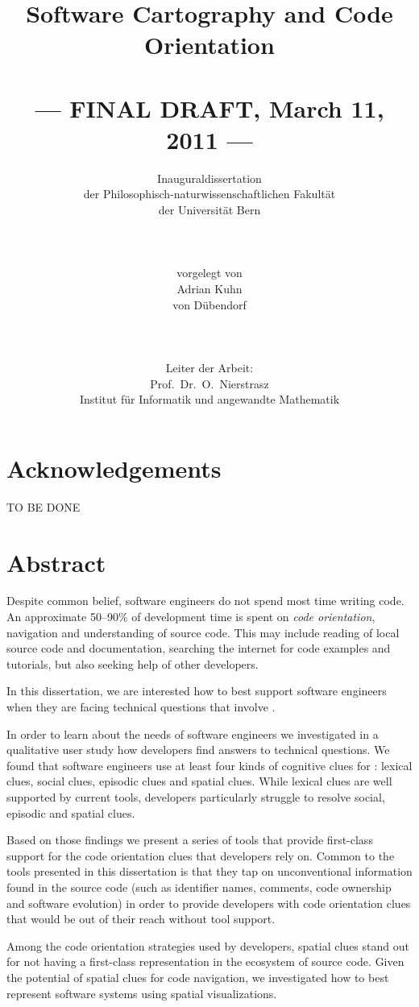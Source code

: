 \documentclass[10pt]{book}
\title{Software Cartography and Code Orientation\\~\\--- FINAL DRAFT, March 11, 2011 ---}
\author{Inauguraldissertation\\
der Philosophisch-naturwissenschaftlichen Fakult\"at\\
der Universit\"at Bern\\
\\
\\
\\
vorgelegt von\\
Adrian Kuhn\\
von D\"ubendorf\\ 
\\
\\
\\
Leiter der Arbeit:\\
Prof.\ Dr.\ O.\ Nierstrasz\\ 
Institut f\"ur Informatik und angewandte Mathematik}
\date{}
\begin{document}
\maketitle

\chapter*{Acknowledgements}
TO BE DONE

\chapter*{Abstract}

Despite common belief, software engineers do not spend most time writing code. An approximate 50--90\% of development time is spent on \emph{code orientation}, \ie navigation and understanding of source code. This may include reading of local source code and documentation, searching the internet for code examples and tutorials, but also seeking help of other developers. 

In this dissertation, we are interested how to best support software engineers when they are facing technical questions that involve \codenavigation. 

In order to learn about the \codenavigation needs of software engineers we investigated in a qualitative user study how developers find answers to technical questions. We found that software engineers use at least four kinds of cognitive clues for \codenavigation: 
	lexical clues, 
	social clues, 
	episodic clues 
	and spatial clues.
While lexical clues are well supported by current tools, developers particularly struggle to resolve social, episodic and spatial clues. 

Based on those findings we present a series of tools that provide first-class support for the code orientation clues that developers rely on. Common to the tools presented in this dissertation is that they tap on unconventional information found in the source code (such as identifier names, comments, code ownership and software evolution) in order to provide developers with code orientation clues that would be out of their reach without tool support.

Among the code orientation strategies used by developers, spatial clues stand out for not having a first-class representation in the ecosystem of source code. Given the potential of spatial clues for code navigation, we investigated how to best represent software systems using spatial visualizations. 
\end{document}
